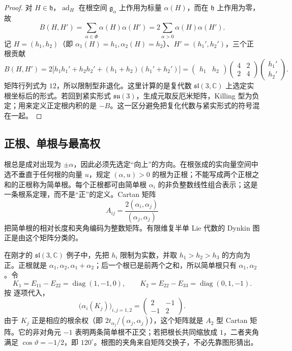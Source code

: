 \begin{proof}
对 $H\in\mathfrak h$，$\operatorname{ad}_H$ 在根空间 $\mathfrak g_\alpha$ 上作用为标量 $\alpha(H)$，而在 $\mathfrak h$ 上作用为零，故
\[
B(H,H')=\sum_{\alpha\in\Phi}\alpha(H)\alpha(H')
=2\sum_{\alpha>0}\alpha(H)\alpha(H').
\]
记 $H=(h_1,h_2)$（即 $\alpha_1(H)=h_1,\alpha_2(H)=h_2$）、$H'=(h_1',h_2')$，三个正根贡献
\[
B(H,H')=2\bigl[h_1h_1'+h_2h_2'+(h_1+h_2)(h_1'+h_2')\bigr]
=\begin{pmatrix}h_1&h_2\end{pmatrix}
\begin{pmatrix}4&2\\2&4\end{pmatrix}
\begin{pmatrix}h_1'\\h_2'\end{pmatrix}.
\]
矩阵行列式为 $12$，所以限制型非退化。这里计算的是复代数
$\mathfrak{sl}(3,\mathbb C)$ 上选定实根坐标后的形式。若回到紧实形式
$\mathfrak{su}(3)$，生成元取反厄米矩阵，Killing 型为负定；用来定义正定根内积的是 $-B$。这一区分避免把复化代数与紧实形式的符号混在一起。
\end{proof}

\subsection{正根、单根与最高权}

根总是成对出现为 $\pm\alpha$，因此必须先选定“向上”的方向。在根张成的实向量空间中选不垂直于任何根的向量 $u$，规定 $(\alpha,u)>0$ 的根为正根；不能写成两个正根之和的正根称为简单根。每个正根都可由简单根 $\alpha_i$ 的非负整数线性组合表示；这是一条根系定理，而不是“正”的定义。Cartan 矩阵
\begin{equation}
A_{ij}=\frac{2(\alpha_i,\alpha_j)}{(\alpha_j,\alpha_j)}
\label{eq:cartan-matrix}
\end{equation}
把简单根的相对长度和夹角编码为整数矩阵。有限维复半单 Lie 代数的 Dynkin 图正是由这个矩阵分类的。

在刚才的 $\mathfrak{sl}(3,\mathbb C)$ 例子中，先把 $h_i$ 限制为实数，并取 $h_1>h_2>h_3$ 的方向为正。正根就是 $\alpha_1,\alpha_2,\alpha_1+\alpha_2$；后一个根已是前两个之和，所以简单根只有 $\alpha_1,\alpha_2$。令
\[
K_1=E_{11}-E_{22}=\operatorname{diag}(1,-1,0),\qquad
K_2=E_{22}-E_{33}=\operatorname{diag}(0,1,-1).
\]
按  逐项代入，
\[
\bigl(\alpha_i(K_j)\bigr)_{i,j=1,2}
=\begin{pmatrix}2&-1\\-1&2\end{pmatrix}.
\]
由于 $K_j$ 正是相应的根余权（即 $2t_{\alpha_j}/(\alpha_j,\alpha_j)$），这个矩阵就是 $A_2$ 型 Cartan 矩阵。它的非对角元 $-1$ 表明两条简单根不正交；若把根长共同缩放成 $1$，二者夹角满足 $\cos\vartheta=-1/2$，即 $120^\circ$。根图的夹角来自矩阵交换子，不必先靠图形猜出。

